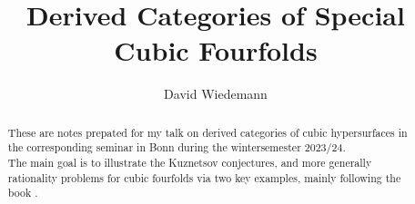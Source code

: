 

\newcommand{\gdim}{\mathrm{gdim}}
\newcommand{\griff}{\mathrm{Griff}}
\title{Derived Categories of Special Cubic Fourfolds}
\author{David Wiedemann}
\date{}

\maketitle
\begin{abstract}
These are notes prepated for my talk on derived categories of cubic hypersurfaces in the corresponding seminar in Bonn during the wintersemester 2023/24.\\
The main goal is to illustrate the Kuznetsov conjectures, and more generally rationality problems for cubic fourfolds via two key examples, mainly following the book \cite{Geometry_Cubic_Huybrechts}.
\end{abstract}

\tableofcontents

